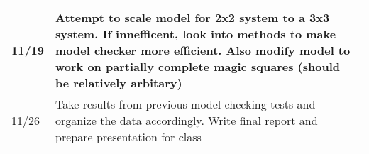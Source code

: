 \documentclass[12pt]{article}
\begin{document}
\begin{enumerate}
\begin{tabular}{| l | p{10cm} |}
11/19 & Attempt to scale model for 2x2 system to a 3x3 system. If innefficent, look into methods to make model checker more efficient. Also modify model to work on partially complete magic squares (should be relatively arbitary) \\ \hline

11/26 & Take results from previous model checking tests and organize the data accordingly. Write final report and prepare presentation for class \\ \hline

\end{tabular}

\end{enumerate}
\end{document}
